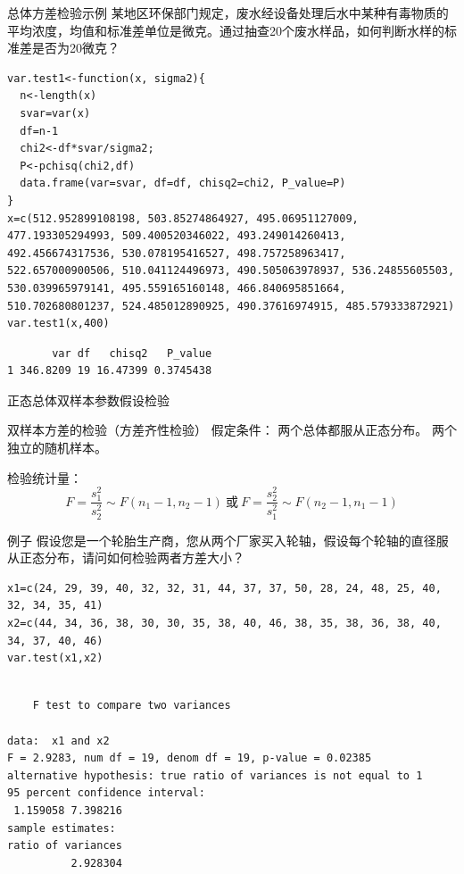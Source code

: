 \documentclass[presentation]{beamer}
\begin{document}
\begin{frame}[fragile,label={sec:org44a58cd}]{总体方差检验示例}
 某地区环保部门规定，废水经设备处理后水中某种有毒物质的平均浓度，均值和标准差单位是微克。通过抽查20个废水样品，如何判断水样的标准差是否为20微克？
\begin{verbatim}
var.test1<-function(x, sigma2){
  n<-length(x)
  svar=var(x)
  df=n-1
  chi2<-df*svar/sigma2;
  P<-pchisq(chi2,df)
  data.frame(var=svar, df=df, chisq2=chi2, P_value=P)
}
x=c(512.952899108198, 503.85274864927, 495.06951127009, 477.193305294993, 509.400520346022, 493.249014260413, 492.456674317536, 530.078195416527, 498.757258963417, 522.657000900506, 510.041124496973, 490.505063978937, 536.24855605503, 530.039965979141, 495.559165160148, 466.840695851664, 510.702680801237, 524.485012890925, 490.37616974915, 485.579333872921)
var.test1(x,400)
\end{verbatim}

\begin{verbatim}
       var df   chisq2   P_value
1 346.8209 19 16.47399 0.3745438
\end{verbatim}
\end{frame}

\begin{frame}[label={sec:org51bf5c5}]{正态总体双样本参数假设检验}
\begin{block}{双样本方差的检验（方差齐性检验）}
假定条件：
 两个总体都服从正态分布。
 两个独立的随机样本。

检验统计量：
$$ F=\frac{s_1^2}{s_2^2}\sim F(n_1-1,n_2-1)\ 或 \ F=\frac{s_2^2}{s_1^2}\sim F(n_2-1,n_1-1)$$
\end{block}
\end{frame}

\begin{frame}[fragile,label={sec:orgc4fd973}]{例子}
 假设您是一个轮胎生产商，您从两个厂家买入轮轴，假设每个轮轴的直径服从正态分布，请问如何检验两者方差大小？
\begin{verbatim}
x1=c(24, 29, 39, 40, 32, 32, 31, 44, 37, 37, 50, 28, 24, 48, 25, 40, 32, 34, 35, 41)
x2=c(44, 34, 36, 38, 30, 30, 35, 38, 40, 46, 38, 35, 38, 36, 38, 40, 34, 37, 40, 46)
var.test(x1,x2)
\end{verbatim}

\begin{verbatim}

	F test to compare two variances

data:  x1 and x2
F = 2.9283, num df = 19, denom df = 19, p-value = 0.02385
alternative hypothesis: true ratio of variances is not equal to 1
95 percent confidence interval:
 1.159058 7.398216
sample estimates:
ratio of variances 
          2.928304 

\end{verbatim}
\end{frame}
\end{document}
